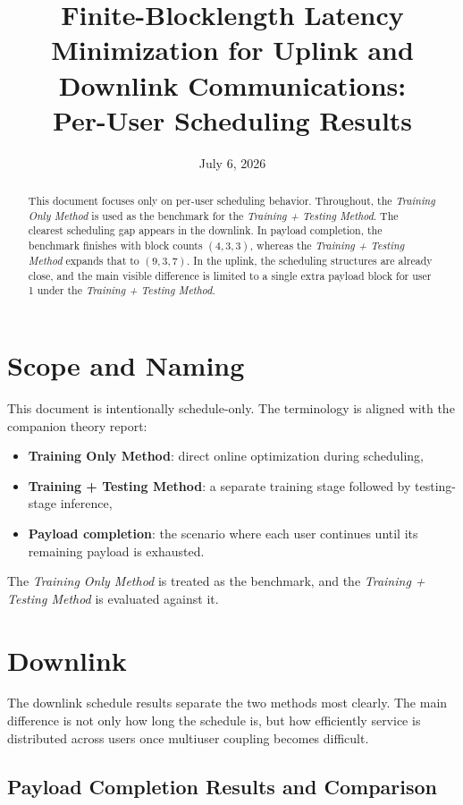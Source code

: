 \documentclass[11pt]{article}
\title{Finite-Blocklength Latency Minimization for Uplink and Downlink Communications:\\Per-User Scheduling Results}
\author{}
\date{July 6, 2026}
\begin{document}
\maketitle

\begin{abstract}
This document focuses only on per-user scheduling behavior. Throughout, the
\emph{Training Only Method} is used as the benchmark for the
\emph{Training + Testing Method}. The clearest scheduling gap appears in the
downlink. In payload completion, the benchmark finishes with block counts
\((4,3,3)\), whereas the \emph{Training + Testing Method} expands that to
\((9,3,7)\). In the uplink, the scheduling structures are already close, and
the main visible difference is limited to a single extra payload block for
user 1 under the \emph{Training + Testing Method}.
\end{abstract}

\section{Scope and Naming}

This document is intentionally schedule-only. The terminology is aligned with
the companion theory report:
\begin{itemize}[leftmargin=1.5em]
    \item \textbf{Training Only Method}: direct online optimization during scheduling,
    \item \textbf{Training + Testing Method}: a separate training stage followed by testing-stage inference,
    \item \textbf{Payload completion}: the scenario where each user continues until its remaining payload is exhausted.
\end{itemize}

The \emph{Training Only Method} is treated as the benchmark, and the
\emph{Training + Testing Method} is evaluated against it.

\section{Downlink}

The downlink schedule results separate the two methods most clearly. The main
difference is not only how long the schedule is, but how efficiently service is
distributed across users once multiuser coupling becomes difficult.

\subsection{Payload Completion Results and Comparison}
\end{document}
